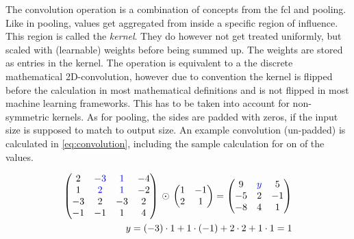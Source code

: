 The convolution operation is a combination of concepts from the fcl and pooling.
Like in pooling, values get aggregated from inside a specific region of influence.
This region is called the \emph{kernel}.
They do however not get treated uniformly, but scaled with (learnable) weights before being summed up.
The weights are stored as entries in the kernel. 
The operation is equivalent to a the discrete mathematical 2D-convolution, however due to convention the kernel is flipped before the calculation in most mathematical definitions \cite{multidimConv} and is not flipped in most machine learning frameworks.
This has to be taken into account for non-symmetric kernels.
As for pooling, the sides are padded with zeros, if the input size is supposed to match to output size. 
An example convolution (un-padded) is calculated in \autoref{eq:convolution}, including the sample calculation for on of the values.

\begin{equation}
    \label{eq:convolution}
    \begin{split}
        \left(\begin{matrix}
            2 & \textcolor{blue}{-3} & \textcolor{blue}{1} & -4 \\
            1 & \textcolor{blue}{2} & \textcolor{blue}{1} & -2 \\
            -3 & 2 & -3 & 2 \\
            -1 & -1 & 1 & 4 \\
        \end{matrix}\right)\,\odot\,
        \left(\begin{matrix}
            1 & -1  \\
            2 & 1   \\
        \end{matrix}\right) = 
        \left(\begin{matrix}
            9 & \textcolor{blue}{y} & 5 \\
            -5 & 2 & -1 \\
            -8 & 4 & 1 \\
        \end{matrix}\right)\\
        y = (-3)\cdot 1 + 1 \cdot (-1) + 2 \cdot 2 + 1 \cdot 1 = 1
    \end{split}
\end{equation}

